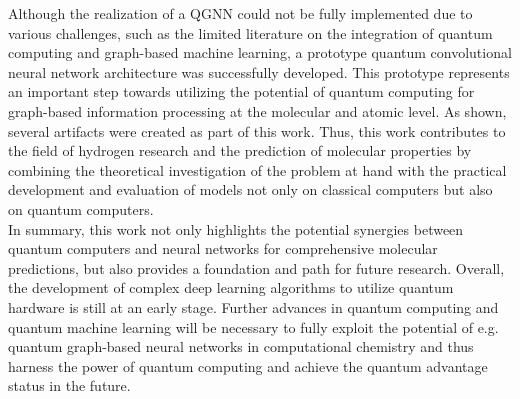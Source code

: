 Although the realization of a QGNN could not be fully implemented due to various challenges, such as the limited literature on the integration of quantum computing and graph-based machine learning, a prototype quantum convolutional neural network architecture was successfully developed. This prototype represents an important step towards utilizing the potential of quantum computing for graph-based information processing at the molecular and atomic level. As shown, several artifacts were created as part of this work. Thus, this work contributes to the field of hydrogen research and the prediction of molecular properties by combining the theoretical investigation of the problem at hand with the practical development and evaluation of models not only on classical computers but also on quantum computers. \\

In summary, this work not only highlights the potential synergies between quantum computers and neural networks for comprehensive molecular predictions, but also provides a foundation and path for future research. Overall, the development of complex deep learning algorithms to utilize quantum hardware is still at an early stage. Further advances in quantum computing and quantum machine learning will be necessary to fully exploit the potential of e.g. quantum graph-based neural networks in computational chemistry and thus harness the power of quantum computing and achieve the quantum advantage status in the future. 



